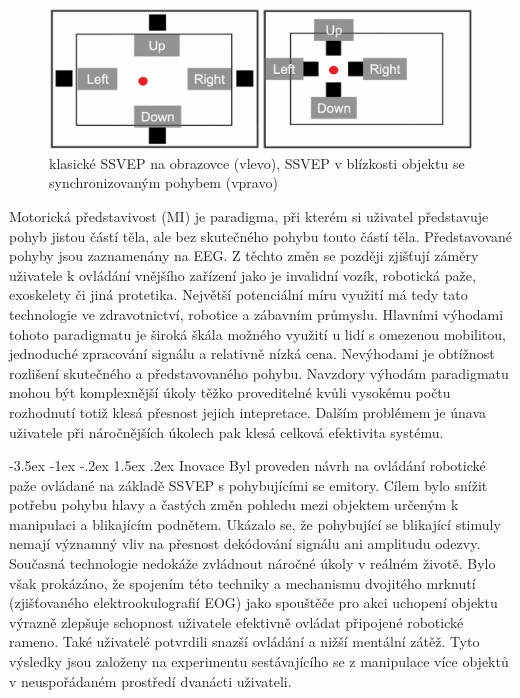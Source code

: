 \documentclass[a4paper,10pt]{article}
\makeatletter
\theoremstyle{definition}
\renewcommand\section{\@startsection {section}{1}{\z@}%
                                   {-3.5ex \@plus -1ex \@minus -.2ex}%
                                   {1.5ex \@plus.2ex}%
                                   {\large\bfseries}}
\makeatother
\begin{document}
\begin{figure}[h]
\begin{center}
\includegraphics[scale=0.5]{image/trackobektu.PNG}
\caption{klasické SSVEP na obrazovce (vlevo), SSVEP v blízkosti objektu se synchronizovaným pohybem (vpravo) \cite{AI2023obrazovky}}
\label{fig:2}
\end{center}
\end{figure}

Motorická představivost (MI) je paradigma, při kterém si uživatel představuje pohyb jistou částí těla, ale bez skutečného pohybu touto částí těla. Představované pohyby jsou zaznamenány na EEG. Z těchto změn se později zjišťují záměry uživatele k ovládání vnějšího zařízení jako je invalidní vozík, robotická paže, exoskelety či jiná protetika. Největší potenciální míru využití má tedy tato technologie ve zdravotnictví, robotice a zábavním průmyslu. Hlavními výhodami tohoto paradigmatu je široká škála možného využití u lidí s omezenou mobilitou, jednoduché zpracování signálu a relativně nízká cena. Nevýhodami je obtížnost rozlišení skutečného a představovaného pohybu. Navzdory výhodám paradigmatu mohou být komplexnější úkoly těžko proveditelné kvůli vysokému počtu rozhodnutí totiž klesá přesnost jejich intepretace. Dalším problémem je únava uživatele při náročnějších úkolech pak klesá celková efektivita systému.\cite{AI2023obrazovky, s23136001obrazekmozkusesenzory, s22135000, article4, article2, zhou2023shared}

\section{Inovace}
\label{sec:4}
Byl proveden návrh na ovládání robotické paže ovládané na základě SSVEP s pohybujícími se emitory. Cílem bylo snížit potřebu pohybu hlavy a častých změn pohledu mezi objektem určeným k manipulaci a blikajícím podnětem. Ukázalo se, že pohybující se blikající stimuly nemají významný vliv na přesnost dekódování signálu ani amplitudu odezvy. Současná technologie nedokáže zvládnout náročné úkoly v reálném životě. Bylo však prokázáno, že spojením této techniky a mechanismu dvojitého mrknutí (zjišťovaného elektrookulografií EOG) jako spouštěče pro akci uchopení objektu výrazně zlepšuje schopnost uživatele efektivně ovládat připojené robotické rameno. Také uživatelé potvrdili snazší ovládání a nižší mentální zátěž. Tyto výsledky jsou založeny na experimentu sestávajícího se z manipulace více objektů v neuspořádaném prostředí dvanácti uživateli.\cite{AI2023obrazovky}
\end{document}
